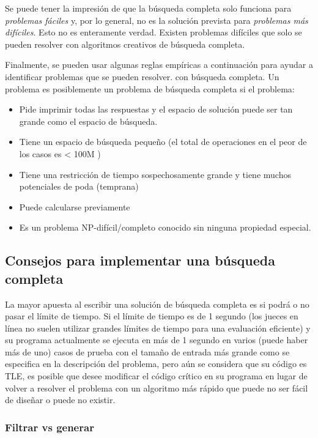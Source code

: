 Se puede tener la impresión de que la búsqueda completa solo funciona para \emph{problemas fáciles} y, por lo general, no es la solución prevista para \emph{problemas más difíciles}. Esto no es enteramente verdad. Existen problemas difíciles que solo se pueden resolver con algoritmos creativos de búsqueda completa. 

Finalmente, se pueden usar algunas reglas empíricas a continuación para ayudar a identificar problemas que se pueden resolver. con búsqueda completa. Un problema es posiblemente un problema de búsqueda completa si el problema:

\begin{itemize}
\item Pide imprimir todas las respuestas y el espacio de solución puede ser tan grande como el espacio de búsqueda.
\item Tiene un espacio de búsqueda pequeño (el total de operaciones en el peor de los casos es < 100M )
\item Tiene una restricción de tiempo sospechosamente grande y tiene muchos potenciales de poda (temprana)
\item  Puede calcularse previamente
\item Es un problema NP-difícil/completo conocido sin ninguna propiedad especial.
\end{itemize}


\subsection{Consejos para implementar una búsqueda completa}

La mayor apuesta al escribir una solución de búsqueda completa es si podrá o no pasar el límite de tiempo. Si el límite de tiempo es de 1 segundo (los jueces en línea no suelen utilizar grandes límites de tiempo para una evaluación eficiente) y su programa actualmente se ejecuta en más de 1 segundo
en varios (puede haber más de uno) casos de prueba con el tamaño de entrada más grande como se especifica en la descripción del problema, pero aún se considera que su código es TLE, es posible que desee modificar el código crítico en su programa en lugar de volver a resolver el problema con un algoritmo más rápido que puede no ser fácil de diseñar o puede no existir.

\subsubsection{Filtrar vs generar}

